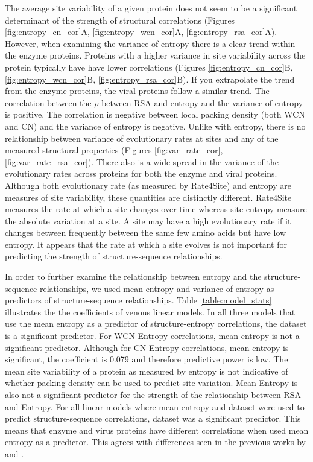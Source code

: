 \documentclass[12pt]{article}
\begin{document}
\indent  The average site variability of a given protein does not seem to be a significant determinant of the strength of structural correlations (Figures \ref{fig:entropy_cn_cor}A, \ref{fig:entropy_wcn_cor}A, \ref{fig:entropy_rsa_cor}A). However, when examining the variance of entropy there is a clear trend within the enzyme proteins.  Proteins with a higher variance in site variability across the protein typically have have lower correlations (Figures \ref{fig:entropy_cn_cor}B, \ref{fig:entropy_wcn_cor}B, \ref{fig:entropy_rsa_cor}B). If you extrapolate the trend from the enzyme proteins, the viral proteins follow a similar trend. The correlation between the $\rho$ between RSA and entropy and the variance of entropy is positive. The correlation is negative between local packing density (both WCN and CN) and the variance of entropy is negative. Unlike with entropy, there is no relationship between variance of evolutionary rates at sites and any of the measured structural properties (Figures \ref{fig:var_rate_cor}, \ref{fig:var_rate_rsa_cor}). There also is a wide spread in the variance of the evolutionary rates across proteins for both the enzyme and viral proteins. Although both evolutionary rate (as measured by Rate4Site) and entropy are measures of site variability, these quantities are distinctly different. Rate4Site measures the rate at which a site changes over time whereas site entropy measure the absolute variation at a site. A site may have a high evolutionary rate if it changes between frequently between the same few amino acids but have low entropy. It appears that the rate at which a site evolves is not important for predicting the strength of structure-sequence relationships.

\indent In order to further examine the relationship between entropy and the structure-sequence relationships, we used mean entropy and variance of entropy as predictors of structure-sequence relationships. Table \ref{table:model_stats} illustrates the the coefficients of venous linear models. In all three models that use the mean entropy as a predictor of structure-entropy correlations, the dataset is a significant predictor. For WCN-Entropy correlations, mean entropy is not a significant predictor. Although for CN-Entropy correlations, mean entropy is significant, the coefficient is 0.079 and therefore predictive power is low. The mean site variability of a protein as measured by entropy is not indicative of whether packing density can be used to predict site variation.  Mean Entropy is also not a significant predictor for the strength of the relationship between RSA and Entropy. For all linear models where mean entropy and dataset were used to predict structure-sequence correlations, dataset was a significant predictor. This means that enzyme and virus proteins have different correlations when used mean entropy as a predictor. This agrees with differences seen in the previous works by \cite{Yehetal2014} and \cite{Shahmoradietal2014}.  
\end{document}
